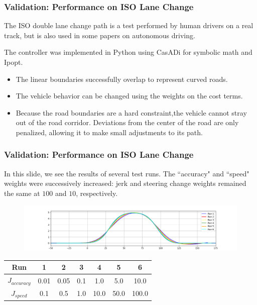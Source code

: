 \documentclass{beamer}
\begin{document}
\begin{frame}
\frametitle{Validation: Performance on ISO Lane Change}
The ISO double lane change path is a test performed by human drivers on a real track, but is also used in some papers on autonomous driving.

The controller was implemented in Python using CasADi for symbolic math and Ipopt.
\begin{itemize}
	\item The linear boundaries successfully overlap to represent curved roads.
	\item The vehicle behavior can be changed using the weights on the cost terms.
	\item Because the road boundaries are a hard constraint,the vehicle cannot stray out of the road corridor. Deviations from the center of the road are only penalized, allowing it to make small adjustments to its path.
\end{itemize}
\end{frame}

\begin{frame}
\frametitle{Validation: Performance on ISO Lane Change}

In this slide, we see the results of several test runs. The ``accuracy" and ``speed" weights were successively increased: jerk and steering change weights remained the same at $100$ and $10$, respectively.

\vspace{-0.5em}
\begin{figure}
	\includegraphics[width=1.0\linewidth]{road_paths.png}
\end{figure}
\vspace{-0.5em}

\begin{table}
	\begin{tabular}{c|cccccc}
Run & 1 & 2 & 3 & 4 & 5 & 6
\\\hline
 $J_{accuracy}$ & 0.01 & 0.05 & 0.1 & 1.0 & 5.0 & 10.0
\\
 $J_{speed}$ & 0.1 & 0.5 & 1.0 & 10.0 & 50.0 & 100.0
\end{tabular}
\end{table}

\end{frame}
\end{document}
